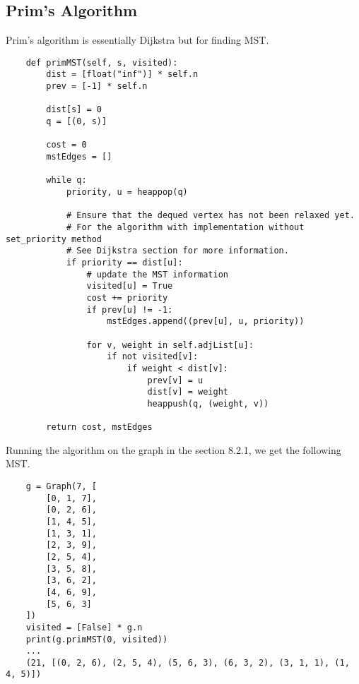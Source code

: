 \subsection{Prim's Algorithm}

\noindent Prim's algorithm is essentially Dijkstra but for finding MST.

\begin{verbatim}
    def primMST(self, s, visited):
        dist = [float("inf")] * self.n
        prev = [-1] * self.n

        dist[s] = 0
        q = [(0, s)]

        cost = 0
        mstEdges = []

        while q:
            priority, u = heappop(q)

            # Ensure that the dequed vertex has not been relaxed yet.
            # For the algorithm with implementation without set_priority method
            # See Dijkstra section for more information.
            if priority == dist[u]:
                # update the MST information
                visited[u] = True
                cost += priority
                if prev[u] != -1:
                    mstEdges.append((prev[u], u, priority))

                for v, weight in self.adjList[u]:
                    if not visited[v]:
                        if weight < dist[v]:
                            prev[v] = u
                            dist[v] = weight
                            heappush(q, (weight, v))

        return cost, mstEdges
\end{verbatim}

\noindent Running the algorithm on the graph in the section 8.2.1, we get the following MST.

\begin{verbatim}
    g = Graph(7, [
        [0, 1, 7],
        [0, 2, 6],
        [1, 4, 5],
        [1, 3, 1],
        [2, 3, 9],
        [2, 5, 4],
        [3, 5, 8],
        [3, 6, 2],
        [4, 6, 9],
        [5, 6, 3]
    ])
    visited = [False] * g.n
    print(g.primMST(0, visited))
    ...
    (21, [(0, 2, 6), (2, 5, 4), (5, 6, 3), (6, 3, 2), (3, 1, 1), (1, 4, 5)])
\end{verbatim}



